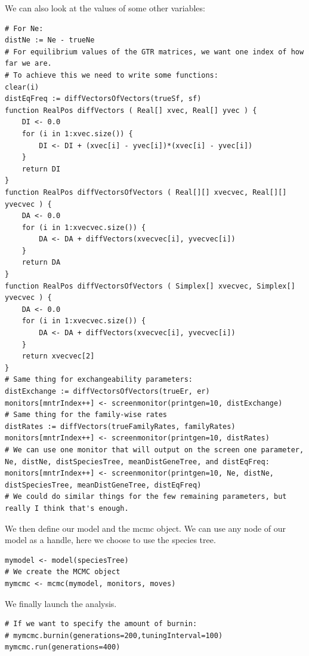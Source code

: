 \documentclass[11pt]{article}
\begin{document}
{\begin{framed}
We can also look at the values of some other variables:
{\tt \begin{snugshade*}
\begin{lstlisting}
# For Ne:
distNe := Ne - trueNe
# For equilibrium values of the GTR matrices, we want one index of how far we are.
# To achieve this we need to write some functions:
clear(i)
distEqFreq := diffVectorsOfVectors(trueSf, sf)	
function RealPos diffVectors ( Real[] xvec, Real[] yvec ) { 
	DI <- 0.0
	for (i in 1:xvec.size()) {
		DI <- DI + (xvec[i] - yvec[i])*(xvec[i] - yvec[i])
	}
	return DI
}
function RealPos diffVectorsOfVectors ( Real[][] xvecvec, Real[][] yvecvec ) { 
	DA <- 0.0
	for (i in 1:xvecvec.size()) {
		DA <- DA + diffVectors(xvecvec[i], yvecvec[i])
	}
	return DA
}		
function RealPos diffVectorsOfVectors ( Simplex[] xvecvec, Simplex[] yvecvec ) { 
	DA <- 0.0
	for (i in 1:xvecvec.size()) {
		DA <- DA + diffVectors(xvecvec[i], yvecvec[i])
	}
	return xvecvec[2]
}
# Same thing for exchangeability parameters:
distExchange := diffVectorsOfVectors(trueEr, er)
monitors[mntrIndex++] <- screenmonitor(printgen=10, distExchange)
# Same thing for the family-wise rates
distRates := diffVectors(trueFamilyRates, familyRates)
monitors[mntrIndex++] <- screenmonitor(printgen=10, distRates)
# We can use one monitor that will output on the screen one parameter, Ne, distNe, distSpeciesTree, meanDistGeneTree, and distEqFreq:
monitors[mntrIndex++] <- screenmonitor(printgen=10, Ne, distNe, distSpeciesTree, meanDistGeneTree, distEqFreq)
# We could do similar things for the few remaining parameters, but really I think that's enough.
\end{lstlisting}
\end{snugshade*}}

We then define our model and the mcmc object. We can use any node of our model as a handle, here we choose to use the species tree.
{\tt \begin{snugshade*}
\begin{lstlisting}
mymodel <- model(speciesTree)
# We create the MCMC object
mymcmc <- mcmc(mymodel, monitors, moves)
\end{lstlisting}
\end{snugshade*}}

We finally launch the analysis.
{\tt \begin{snugshade*}
\begin{lstlisting}
# If we want to specify the amount of burnin:
# mymcmc.burnin(generations=200,tuningInterval=100)
mymcmc.run(generations=400)


\end{lstlisting}
\end{snugshade*}}
\end{framed}}
\end{document}
